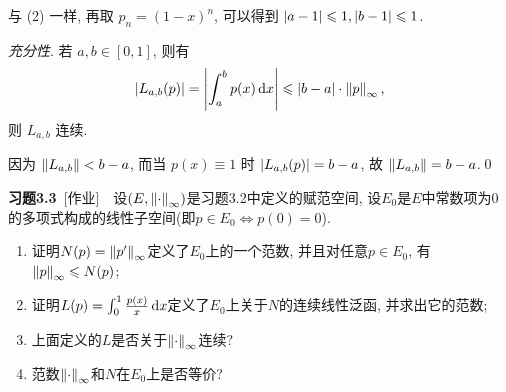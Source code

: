 \begin{Proof}
        与 (2) 一样, 再取 $ p_{n}=(1-x)^{n} $, 可以得到 $ \left| a-1 \right| \leqslant1, \left| b-1 \right| \leqslant1 $.

        \textsl{充分性}. 若 $ a, b\in[0, 1] $, 则有
        \[
            \left| L_{a, b}(p) \right| =\left| \int_{a}^{b}p(x)\,\mathrm{d} x \right| \leqslant \left| b-a \right| \cdot \left\| p \right\|_{\infty},
        \]
        则 $ L_{a, b} $ 连续.

        因为 $ \left\| L_{a, b} \right\|<b-a $, 而当 $ p(x)\equiv 1 $ 时 $ \left| L_{a, b}(p) \right| =b-a $, 故 $ \left\| L_{a, b} \right\|=b-a $.\qed
    \end{Proof}

    \textbf{习题3.3}\ [作业]\ \ 设$ (E,\left\| \cdot \right\|_\infty) $是习题3.2中定义的赋范空间, 设$ E_0 $是$ E $中常数项为0的多项式构成的线性子空间(即$ p\in E_0\Longleftrightarrow p(0)=0 $).
    \begin{enumerate}[(1)]
    \item 证明$ N(p)=\left\| p' \right\|_\infty $定义了$ E_0 $上的一个范数, 并且对任意$ p\in E_0 $, 有$ \left\| p \right\|_\infty\leqslant N(p) $;
    \item 证明$ L(p)=\int_0^1\frac{p(x)}{x}\,\mathrm{d} x $定义了$ E_0 $上关于$ N $的连续线性泛函, 并求出它的范数;
    \item 上面定义的$ L $是否关于$ \left\| \cdot \right\|_\infty $连续?
    \item 范数$ \left\| \cdot \right\|_\infty $和$ N $在$ E_0 $上是否等价?
    \end{enumerate}
